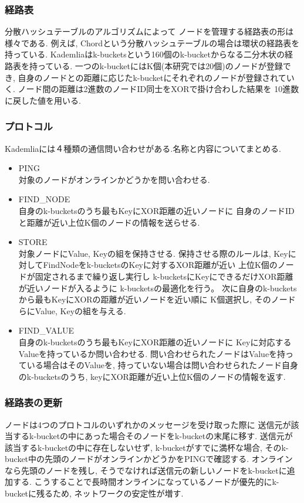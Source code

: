 \documentclass[sotsuron]{jcsie}
\begin{document}
\subsubsection{経路表}
分散ハッシュテーブルのアルゴリズムによって
ノードを管理する経路表の形は様々である.
例えば, Chordという分散ハッシュテーブルの場合は環状の経路表を持っている.
Kademliaはk-bucketsという160個のk-bucketからなる二分木状の経路表を持っている.
一つのk-bucketにはK個(本研究では20個)のノードが登録でき, 
自身のノードとの距離に応じたk-bucketにそれぞれのノードが登録されていく.
ノード間の距離は2進数のノードID同士をXORで掛け合わした結果を
10進数に戻した値を用いる.

\subsubsection{プロトコル}
Kademliaには４種類の通信問い合わせがある.名称と内容についてまとめる.
\begin{itemize}
	\item {PING}\\
		  対象のノードがオンラインかどうかを問い合わせる.\\
	\item {FIND\_NODE}\\
	      自身のk-bucketsのうち最もKeyにXOR距離の近いノードに
	      自身のノードIDと距離が近い上位K個のノードの情報を送らせる.\\
	\item {STORE}\\
	      対象ノードにValue, Keyの組を保持させる.
		  保持させる際のルールは, 
		  Keyに対してFindNodeをk-bucketsのKeyに対するXOR距離が近い
		  上位K個のノードが固定されるまで繰り返し実行し
		  k-bucketsにKeyにできるだけXOR距離が近いノードが入るように
		  k-bucketsの最適化を行う。
		  次に自身のk-bucketsから最もKeyにXORの距離が近いノードを近い順に
		  K個選択し, そのノードらにValue, Keyの組を与える.\\	
	\item {FIND\_VALUE}\\
	      自身のk-bucketsのうち最もKeyにXOR距離の近いノードに
	      Keyに対応するValueを持っているか問い合わせる.
	      問い合わせられたノードはValueを持っている場合はそのValueを, 
	      持っていない場合は問い合わせられたノード自身のk-bucketsのうち, 
	      keyにXOR距離が近い上位K個のノードの情報を返す.\\
\end{itemize}

\subsubsection{経路表の更新}
ノードは4つのプロトコルのいずれかのメッセージを受け取った際に
送信元が該当するk-bucketの中にあった場合そのノードをk-bucketの末尾に移す.
送信元が該当するk-bucketの中に存在しないせず, k-bucketがすでに満杯な場合, 
そのk-bucket中の先頭のノードがオンラインかどうかをPINGで確認する.
オンラインなら先頭のノードを残し, 
そうでなければ送信元の新しいノードをk-bucketに追加する.
こうすることで長時間オンラインになっているノードが優先的にk-bucketに残るため, 
ネットワークの安定性が増す.
\end{document}
